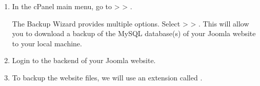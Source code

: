 \documentclass[letterpaper,10pt,english]{sphinxmanual}
\begin{document}
\begin{enumerate}
\begin{itemize}
\end{itemize}

\item {} 
\sphinxAtStartPar
In the cPanel main menu, go to  >  > .
\begin{quote}

\begin{figure}[htbp]
\centering

\noindent{}
\end{figure}
\end{quote}

\sphinxAtStartPar
The Backup Wizard provides multiple options. Select  >  > . This will allow you to download a backup of the MySQL database(s) of your Joomla website to your local machine.
\begin{quote}

\begin{figure}[htbp]
\centering

\noindent{}
\end{figure}
\end{quote}

\item {} 
\sphinxAtStartPar
Login to the backend of your Joomla website.
\begin{quote}

\begin{figure}[htbp]
\centering

\noindent{}
\end{figure}

\newpage
\end{quote}

\item {} 
\sphinxAtStartPar
To backup the website files, we will use an extension called .
\begin{quote}

\begin{figure}[htbp]
\centering

\noindent{}
\end{figure}
\end{quote}


\end{enumerate}
\end{document}

